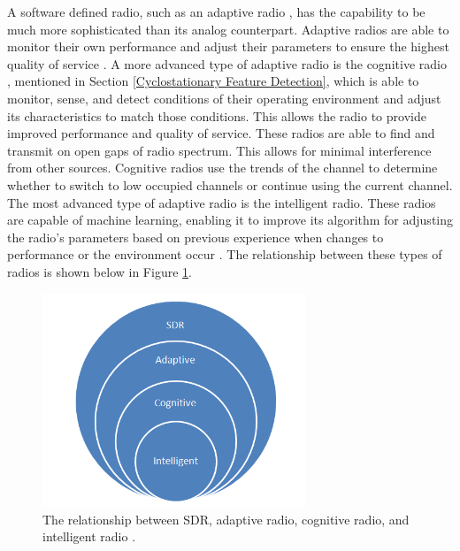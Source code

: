 A software defined radio, such as an adaptive radio \cite{cog_radios}, has the capability to be much more sophisticated than its analog counterpart. Adaptive radios are able to monitor their own performance and adjust their parameters to ensure the highest quality of service \cite{cog_radios}. A more advanced type of adaptive radio is the cognitive radio \cite{cog_radios}, mentioned in Section \ref{Cyclostationary Feature Detection}, which is able to monitor, sense, and detect conditions of their operating environment and adjust its characteristics to match those conditions. This allows the radio to provide improved performance and quality of service. These radios are able to find and transmit on open gaps of radio spectrum. This allows for minimal interference from other sources. Cognitive radios use the trends of the channel to determine whether to switch to low occupied channels or continue using the current channel. The most advanced type of adaptive radio is the intelligent radio. These radios are capable of machine learning, enabling it to improve its algorithm for adjusting the radio's parameters based on previous experience when changes to performance or the environment occur \cite{int_radio}. The relationship between these types of radios is shown below in Figure \ref{fig:sdr_relationship_diagram}.\par
\begin{figure}[ht]
\centering
\includegraphics[width=0.70\textwidth]{img/sdr_diagram2.png}
\caption{The relationship between SDR, adaptive radio, cognitive radio, and intelligent radio \cite{int_radio}.}
\label{fig:sdr_relationship_diagram}
\end{figure}\par
